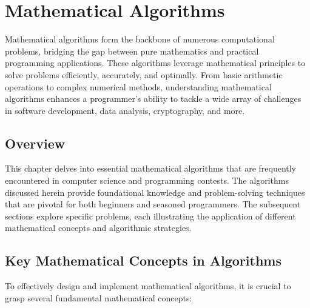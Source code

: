 
\chapter{Mathematical Algorithms}
\label{chap:Mathematical_Algorithms}

Mathematical algorithms form the backbone of numerous computational problems, bridging the gap between pure mathematics and practical programming applications. These algorithms leverage mathematical principles to solve problems efficiently, accurately, and optimally. From basic arithmetic operations to complex numerical methods, understanding mathematical algorithms enhances a programmer's ability to tackle a wide array of challenges in software development, data analysis, cryptography, and more.

\section*{Overview}
This chapter delves into essential mathematical algorithms that are frequently encountered in computer science and programming contests. The algorithms discussed herein provide foundational knowledge and problem-solving techniques that are pivotal for both beginners and seasoned programmers. The subsequent sections explore specific problems, each illustrating the application of different mathematical concepts and algorithmic strategies.

\section{Key Mathematical Concepts in Algorithms}
To effectively design and implement mathematical algorithms, it is crucial to grasp several fundamental mathematical concepts:

